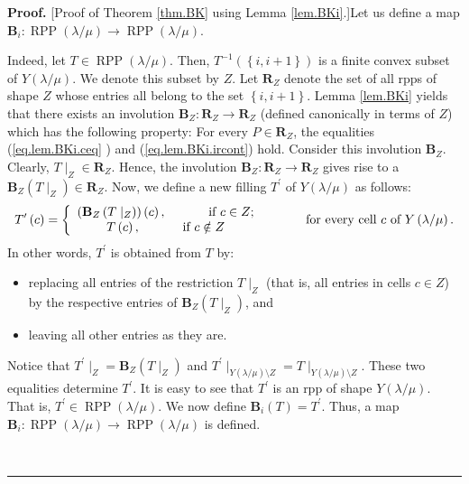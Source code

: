 \documentclass[numbers=enddot,12pt,final,onecolumn,notitlepage]{scrartcl}%
\theoremstyle{definition}
\newenvironment{proof}[1][Proof]{\noindent\textbf{#1.} }{\ \rule{0.5em}{0.5em}}
\newenvironment{vershort}{}{}
\begin{document}
\begin{vershort}
\begin{proof}
[Proof of Theorem \ref{thm.BK} using Lemma \ref{lem.BKi}.]Let us define a map
$\mathbf{B}_{i}:\operatorname*{RPP}\left(  \lambda/\mu\right)  \rightarrow
\operatorname*{RPP}\left(  \lambda/\mu\right)  $.

Indeed, let $T\in\operatorname*{RPP}\left(  \lambda/\mu\right)  $. Then,
$T^{-1}\left(  \left\{  i,i+1\right\}  \right)  $ is a finite convex subset of
$Y\left(  \lambda/\mu\right)  $. We denote this subset by $Z$. Let
$\mathbf{R}_{Z}$ denote the set of all rpps of shape $Z$ whose entries all
belong to the set $\left\{  i,i+1\right\}  $. Lemma \ref{lem.BKi} yields that
there exists an involution $\mathbf{B}_{Z}:\mathbf{R}_{Z}\rightarrow
\mathbf{R}_{Z}$ (defined canonically in terms of $Z$) which has the following
property: For every $P\in\mathbf{R}_{Z}$, the equalities (\ref{eq.lem.BKi.ceq}%
) and (\ref{eq.lem.BKi.ircont}) hold. Consider this involution $\mathbf{B}%
_{Z}$. Clearly, $T\mid_{Z}\in\mathbf{R}_{Z}$. Hence, the involution
$\mathbf{B}_{Z}:\mathbf{R}_{Z}\rightarrow\mathbf{R}_{Z}$ gives rise to a
$\mathbf{B}_{Z}\left(  T\mid_{Z}\right)  \in\mathbf{R}_{Z}$. Now, we define a
new filling $T^{\prime}$ of $Y\left(  \lambda/\mu\right)  $ as follows:%
\[
T^{\prime}\left(  c\right)  =\left\{
\begin{array}
[c]{c}%
\left(  \mathbf{B}_{Z}\left(  T\mid_{Z}\right)  \right)  \left(  c\right)
,\ \ \ \ \ \ \ \ \ \ \text{if }c\in Z;\\
T\left(  c\right)  ,\ \ \ \ \ \ \ \ \ \ \text{if }c\notin Z
\end{array}
\right.  \ \ \ \ \ \ \ \ \ \ \text{for every cell }c\text{ of }Y\left(
\lambda/\mu\right)  .
\]
In other words, $T^{\prime}$ is obtained from $T$ by:

\begin{itemize}
\item replacing all entries of the restriction $T\mid_{Z}$ (that is, all
entries in cells $c\in Z$) by the respective entries of $\mathbf{B}_{Z}\left(
T\mid_{Z}\right)  $, and

\item leaving all other entries as they are.
\end{itemize}

Notice that $T^{\prime}\mid_{Z}=\mathbf{B}_{Z}\left(  T\mid_{Z}\right)  $ and
$T^{\prime}\mid_{Y\left(  \lambda/\mu\right)  \setminus Z}=T\mid_{Y\left(
\lambda/\mu\right)  \setminus Z}$. These two equalities determine $T^{\prime}%
$. It is easy to see that $T^{\prime}$ is an rpp of shape $Y\left(
\lambda/\mu\right)  $. That is, $T^{\prime}\in\operatorname*{RPP}\left(
\lambda/\mu\right)  $. We now define $\mathbf{B}_{i}\left(  T\right)
=T^{\prime}$. Thus, a map $\mathbf{B}_{i}:\operatorname*{RPP}\left(
\lambda/\mu\right)  \rightarrow\operatorname*{RPP}\left(  \lambda/\mu\right)
$ is defined.


\end{proof}
\end{vershort}
\end{document}
